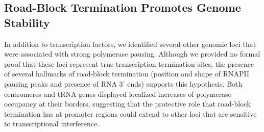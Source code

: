 


\subsection{Road-Block Termination Promotes Genome Stability}

In addition to transcription factors, we identified several other genomic loci that were associated with strong polymerase pausing. 
Although we provided no formal proof that these loci represent true transcription termination sites, the presence of several hallmarks of road-block termination (position and shape of RNAPII pausing peaks and presence of RNA 3’ ends) supports this hypothesis. 
Both centromeres and tRNA genes displayed localized increases of polymerase occupancy at their borders, suggesting that the protective role that road-block termination has at promoter regions could extend to other loci that are sensitive to transcriptional interference. 

